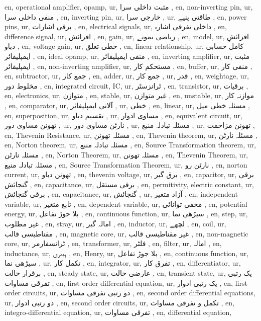 en, operational amplifier, opamp,
ur, مثبت داخلی سرا ,
en, non-inverting pin,
ur, منفی داخلی سرا ,
en, inverting pin,
ur, خارجی سرا ,
ur, طاقتی پنیے ,
en, power pins,
ur, برقی اشارات ,
en, electrical signals,
ur, داخلی تفرقی اشارہ ,
en, difference signal,
ur, افزائش ,
en, gain,
ur, ریاضی نمونے ,
en, model,
ur, افزائشِ دباو ,
en, voltage gain,
ur, خطی تعلق ,
en, linear relationship,
ur, کامل حسابی ایمپلیفائر ,
en, ideal opamp,
ur, منفی ایمپلیفائر ,
en, inverting amplifier,
ur, مثبت ایمپلیفائر ,
en, non-inverting amplifier,
ur, مستحکم کار ,
en, buffer,
ur, منفی کار ,
en, subtractor,
ur, جمع کار ,
en, adder,
ur, جمع کار ,
ur, قدر ,
en, weightage,
ur, مخلوط دور ,
en, integrated circuit, IC,
ur, ٹرانزسٹر ,
en, transistor,
ur, برقیات ,
en, electronics,
ur, متوازن ,
en, stable,
ur, غیر متوازن ,
en, unstable,
ur, موازنہ کار ,
en, comparator,
ur, آلاتی ایمپلیفائر ,
ur, خطی ,
en, linear,
ur, مسئلہ خطی میل ,
en, superposition,
ur, تقسیم دباو ,
ur, مساوی ادوار ,
en, equivalent circuit,
ur, تھونن مساوی دور ,
ur, نارٹن مساوی دور ,
ur, مسئلہ تبادلہ منبع ,
ur, تھونن مزاحمت ,
en, Thevenin Resistance,
ur, مسئلہ تھونن ,
en, Thevenin theorem,
ur, مسئلہ نارٹن ,
en, Norton theorem,
ur, مسئلہ تبادلہ منبع ,
en, Source Transformation theorem,
ur, مسئلہ نارٹن ,
en, Norton Theorem,
ur, مسئلہ تھونن ,
en, Thevenin Theorem,
ur, مسئلہ تبادلہ منبع ,
en, Source Transformation Theorem,
ur, نارٹن رو ,
en, norton current,
ur, تھونن دباو ,
en, thevenin voltage,
ur, برق گیر ,
en, capacitor,
ur, برقی گنجائش ,
en, capacitance,
ur, برقی مستقل ,
en, permitivity, electric constant,
ur, برقی گنجائش ,
en, capacitance,
ur, گنجائش ,
ur, آزاد متغیر ,
en, independent variable,
ur, تابع متغیر ,
en, dependent variable,
ur, مخفی توانائی ,
en, potential energy,
ur, بلا جوڑ تفاعل ,
en, continuous function,
ur, سیڑھی نما ,
en, step,
ur, غیر مطلوب ,
en, stray,
ur, امالہ گیر ,
en, inductor,
ur, لچھے ,
en, coil,
ur, مقناطیسی قالب ,
en, magnetic core,
ur, غیر مقناطیسی قالب ,
en, non-magnetic core,
ur, ٹرانسفارمر ,
en, transformer,
ur, فلٹر ,
en, filter,
ur, امالہ ,
en, inductance,
ur, ہینری ,
en, Henry,
ur, بلا جوڑ تفاعل ,
en, continuous function,
ur, سیڑھی نما ,
ur, تکمل کار ,
en, integrator,
ur, تفرق کار ,
en, differentiator,
ur, برقرار حالت ,
en, steady state,
ur, عارضی حالت ,
en, transient state,
ur, یک رتبی تفرقی مساوات ,
en, first order differential equation,
ur, یک رتبی ادوار ,
en, first order circuits,
ur, دو رتبی تفرقی مساوات ,
en, second order differential equations,
ur, دو رتبی ادوار ,
en, second order circuits,
ur, تکمل و تفرقی مساوات ,
en, integro-differential equation,
ur, تفرقی مساوات ,
en, differential equation,
